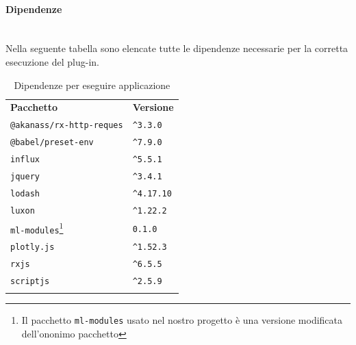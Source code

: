 \paragraph*{Dipendenze}\mbox{}\\ [1mm]
Nella seguente tabella sono elencate tutte le dipendenze necessarie per la corretta esecuzione del plug-in.
\mbox{}\\ [1mm]
\setcounter{table}{0}
\begin{longtable} {
		>{}p{65mm} 
		>{}p{30mm}
	}
	\rowcolor{gray!50}
	\textbf{Pacchetto} & \textbf{Versione} \TBstrut \\ [2mm]
	\verb|@akanass/rx-http-reques| & \verb|^3.3.0|  \TBstrut \\ [2mm]
	\verb|@babel/preset-env| & \verb|^7.9.0| \TBstrut \\ [2mm]
	\verb|influx| & \verb|^5.5.1| \TBstrut \\ [2mm]
	\verb|jquery| & \verb|^3.4.1| \TBstrut \\ [2mm]
	\verb|lodash| & \verb|^4.17.10| \TBstrut \\ [2mm]
	\verb|luxon| & \verb|^1.22.2| \TBstrut \\ [2mm]
	\verb|ml-modules|\footnote{Il pacchetto \texttt{ml-modules} usato nel nostro progetto è una versione modificata dell'ononimo pacchetto} & \verb|0.1.0| \TBstrut \\ [2mm]
	\verb|plotly.js| & \verb|^1.52.3| \TBstrut \\ [2mm]
	\verb|rxjs| & \verb|^6.5.5| \TBstrut \\ [2mm]
	\verb|scriptjs| & \verb|^2.5.9| \TBstrut \\ [2mm]
	\rowcolor{white}
	\caption{Dipendenze per eseguire applicazione}
\end{longtable}

